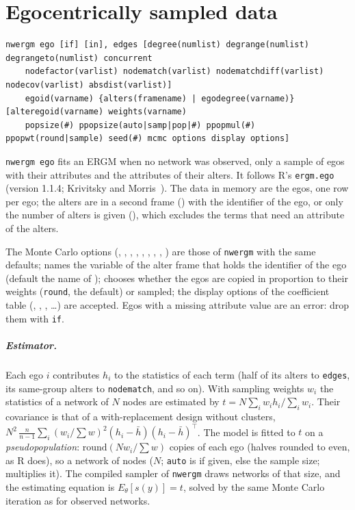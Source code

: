 \chapter{Egocentrically sampled data}\label{ch:ego}

\begin{lstlisting}
nwergm ego [if] [in], edges [degree(numlist) degrange(numlist) degrangeto(numlist) concurrent
    nodefactor(varlist) nodematch(varlist) nodematchdiff(varlist) nodecov(varlist) absdist(varlist)]
    egoid(varname) {alters(framename) | egodegree(varname)} [alteregoid(varname) weights(varname)
    popsize(#) ppopsize(auto|samp|pop|#) ppopmul(#) ppopwt(round|sample) seed(#) mcmc options display options]
\end{lstlisting}
\texttt{nwergm ego} fits an ERGM when no network was observed, only a sample of egos with their attributes and the attributes of their alters. It follows R's \texttt{ergm.ego} (version 1.1.4; Krivitsky and Morris~\cite{krivitsky2017}). The data in memory are the egos, one row per ego; the alters are in a second frame () with the identifier of the ego, or only the number of alters is given (), which excludes the terms that need an attribute of the alters.

The Monte Carlo options (, , , , , , , , ) are those of \texttt{nwergm} with the same defaults;  names the variable of the alter frame that holds the identifier of the ego (default the name of );  chooses whether the egos are copied in proportion to their weights (\texttt{round}, the default) or sampled; the display options of the coefficient table (, , , \ldots) are accepted. Egos with a missing attribute value are an error: drop them with \texttt{if}.

\paragraph{Estimator.} Each ego $i$ contributes $h_i$ to the statistics of each term (half of its alters to \texttt{edges}, its same-group alters to \texttt{nodematch}, and so on). With sampling weights $w_i$ the statistics of a network of $N$ nodes are estimated by $t=N\sum_i w_i h_i/\sum_i w_i$. Their covariance is that of a with-replacement design without clusters, $N^2\,\tfrac{n}{n-1}\sum_i (w_i/\sum w)^2(h_i-\bar h)(h_i-\bar h)^\top$. The model is fitted to $t$ on a \emph{pseudopopulation}: $\mathrm{round}(N w_i/\sum w)$ copies of each ego (halves rounded to even, as R does), so a network of  nodes ($N$; \texttt{auto} is  if given, else the sample size;  multiplies it). The compiled sampler of \texttt{nwergm} draws networks of that size, and the estimating equation is $E_\theta[s(y)]=t$, solved by the same Monte Carlo iteration as for observed networks.

